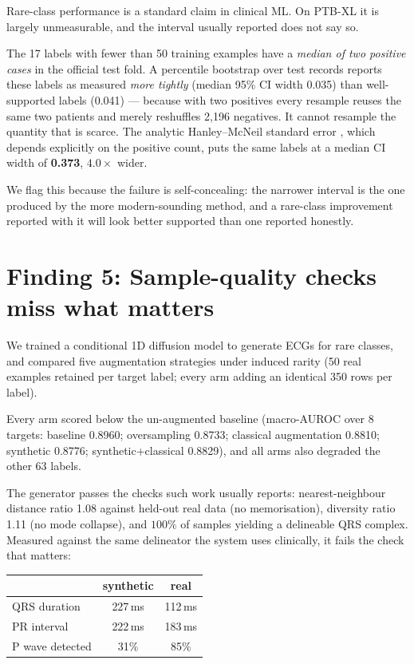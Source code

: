 \documentclass[pmlr,twocolumn,10pt]{jmlr}
\begin{document}
Rare-class performance is a standard claim in clinical ML. On PTB-XL it is largely
unmeasurable, and the interval usually reported does not say so.

The 17 labels with fewer than 50 training examples have a \emph{median of two positive cases}
in the official test fold. A percentile bootstrap over test records reports these labels as
measured \emph{more tightly} (median 95\% CI width 0.035) than well-supported labels (0.041)
--- because with two positives every resample reuses the same two patients and merely
reshuffles 2{,}196 negatives. It cannot resample the quantity that is scarce. The analytic
Hanley--McNeil standard error \citep{hanley1982meaning}, which depends explicitly on the
positive count, puts the same labels at a median CI width of \textbf{0.373}, $4.0\times$
wider.

We flag this because the failure is self-concealing: the narrower interval is the one
produced by the more modern-sounding method, and a rare-class improvement reported with it
will look better supported than one reported honestly.

\section{Finding 5: Sample-quality checks miss what matters}
\label{sec:synth}

We trained a conditional 1D diffusion model \citep{ho2020denoising} to generate ECGs for
rare classes, and compared five augmentation strategies under induced rarity (50 real
examples retained per target label; every arm adding an identical 350 rows per label).

Every arm scored below the un-augmented baseline (macro-AUROC over 8 targets: baseline
0.8960; oversampling 0.8733; classical augmentation 0.8810; synthetic 0.8776;
synthetic+classical 0.8829), and all arms also degraded the other 63 labels.

The generator passes the checks such work usually reports: nearest-neighbour distance ratio
1.08 against held-out real data (no memorisation), diversity ratio 1.11 (no mode collapse),
and $100\%$ of samples yielding a delineable QRS complex. Measured against the same
delineator the system uses clinically, it fails the check that matters:

\begin{center}
\begin{tabular}{lcc}
\toprule
 & synthetic & real \\
\midrule
QRS duration    & 227\,ms & 112\,ms \\
PR interval     & 222\,ms & 183\,ms \\
P wave detected & 31\% & 85\% \\
\bottomrule
\end{tabular}
\end{center}
\end{document}
